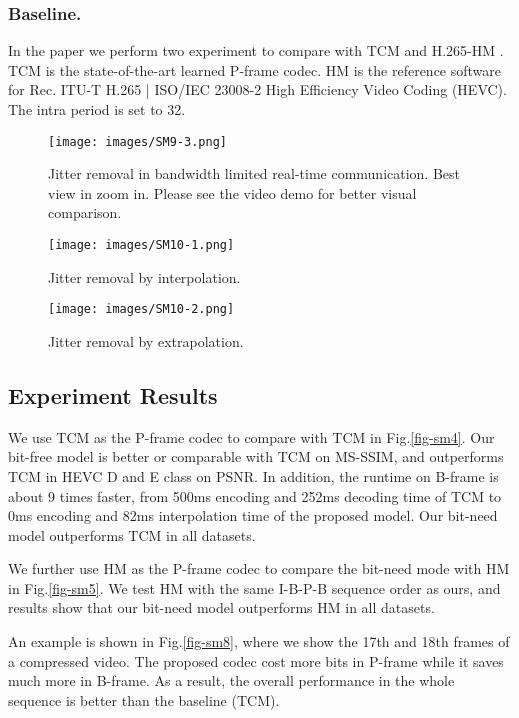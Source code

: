 \documentclass[sigconf]{acmart}
\begin{document}
\subsubsection{Baseline.} In the paper we perform two experiment to compare with TCM \cite{sheng2021temporal} and H.265-HM \cite{HM}. TCM is the state-of-the-art learned P-frame codec. HM is the reference software for Rec. ITU-T H.265 | ISO/IEC 23008-2 High Efficiency Video Coding (HEVC). The intra period is set to 32. 


\begin{figure*}[h]
    \centering
    \texttt{[image: images/SM9-3.png]}
    \caption{Jitter removal in bandwidth limited real-time communication. Best view in zoom in. Please see the video demo for better visual comparison.}
    \label{fig-sm9}
\end{figure*}


\begin{figure}[h]
    \centering
    \texttt{[image: images/SM10-1.png]}
    \caption{Jitter removal by interpolation.}
    \label{fig-sm10-1}
\end{figure}

\begin{figure}[h]
    \centering
    \texttt{[image: images/SM10-2.png]}
    \caption{Jitter removal by extrapolation.}
    \label{fig-sm10-2}
\end{figure}
\subsection{Experiment Results}

We use TCM as the P-frame codec to compare with TCM in Fig.\ref{fig-sm4}. Our bit-free model is better or comparable with TCM on MS-SSIM, and outperforms TCM in HEVC D and E class on PSNR. In addition, the runtime on B-frame is about 9 times faster, from 500ms encoding and 252ms decoding time of TCM to 0ms encoding and 82ms interpolation time of the proposed model. Our bit-need model outperforms TCM in all datasets. 

We further use HM as the P-frame codec to compare the bit-need mode with HM in Fig.\ref{fig-sm5}. We test HM with the same I-B-P-B sequence order as ours, and results show that our bit-need model outperforms HM in all datasets. 

An example is shown in Fig.\ref{fig-sm8}, where we show the 17th and 18th frames of a compressed video. The proposed codec cost more bits in P-frame while it saves much more in B-frame. As a result, the overall performance in the whole sequence is better than the baseline (TCM). 
 
\end{document}
